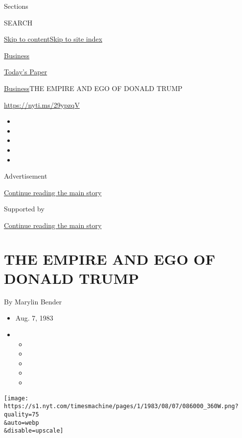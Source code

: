 Sections

SEARCH

\protect\hyperlink{site-content}{Skip to
content}\protect\hyperlink{site-index}{Skip to site index}

\href{https://www.nytimes.com/section/business}{Business}

\href{https://myaccount.nytimes.com/auth/login?response_type=cookie\&client_id=vi}{}

\href{https://www.nytimes.com/section/todayspaper}{Today's Paper}

\href{/section/business}{Business}\textbar{}THE EMPIRE AND EGO OF DONALD
TRUMP

\url{https://nyti.ms/29ypzqV}

\begin{itemize}
\item
\item
\item
\item
\item
\end{itemize}

Advertisement

\protect\hyperlink{after-top}{Continue reading the main story}

Supported by

\protect\hyperlink{after-sponsor}{Continue reading the main story}

\hypertarget{the-empire-and-ego-of-donald-trump}{%
\section{THE EMPIRE AND EGO OF DONALD
TRUMP}\label{the-empire-and-ego-of-donald-trump}}

By Marylin Bender

\begin{itemize}
\item
  Aug. 7, 1983
\item
  \begin{itemize}
  \item
  \item
  \item
  \item
  \item
  \end{itemize}
\end{itemize}

\texttt{[image: https://s1.nyt.com/timesmachine/pages/1/1983/08/07/086000\_360W.png?quality=75\\\&auto=webp\\\&disable=upscale]}

